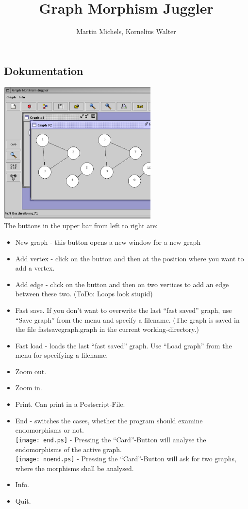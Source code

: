\documentclass[a4paper]{article}
\title{Graph Morphism Juggler}
\author{Martin Michels, Kornelius Walter}
\begin{document}
\subsection*{Dokumentation}
\includegraphics[width=8cm]{main.ps}\\
The buttons in the upper bar from left to right are:
\begin{itemize}
\item New graph - this button opens a new window for a new graph
\item Add vertex - click on the button and then at the position where
  you want to add a vertex.
\item Add edge - click on the button and then on two vertices to add
  an edge between these two. (ToDo: Loops look stupid)
\item Fast save. If you don't want to overwrite the last ``fast
  saved'' graph, use ``Save graph'' from the menu and specify a
  filename. (The graph is saved in the file fastsavegraph.graph in the
  current working-directory.)
\item Fast load - loads the last ``fast saved'' graph.  Use ``Load
  graph'' from the menu for specifying a filename.
\item Zoom out.
\item Zoom in.
\item Print. Can print in a Postscript-File.
\item End - switches the cases, whether the program should examine
  endomorphisms or not.\\
  \texttt{[image: end.ps]} - Pressing the ``Card''-Button will analyse 
  the endomorphisms of the active graph.\\
  \texttt{[image: noend.ps]} -  Pressing the ``Card''-Button will ask 
  for two graphs, where the morphisms shall be analysed.
\item Info.
\item Quit.
\end{itemize}
\end{document}
